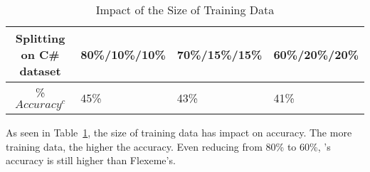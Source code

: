 
\begin{table}[t]
\caption{Impact of the Size of Training Data}
	\vspace{-7pt}
	\tabcolsep 2pt
	\small
	\begin{center}
\begin{tabular}{|c|l|l|l|}
  \hline
  Splitting on C\# dataset & 80\%/10\%/10\% & 70\%/15\%/15\% & 60\%/20\%/20\% \\
  \hline
  \% $Accuracy^{c}$ & 45\% & 43\% & 41\% \\
  \hline
\end{tabular}
\label{splitting}
	\end{center}
\vspace{-3pt}
\end{table}

As seen in Table~\ref{splitting}, the size of training data has impact
on accuracy. The more training data, the higher the accuracy.  Even
reducing from 80\% to 60\%, {\tool}'s accuracy is still higher than
Flexeme's.

